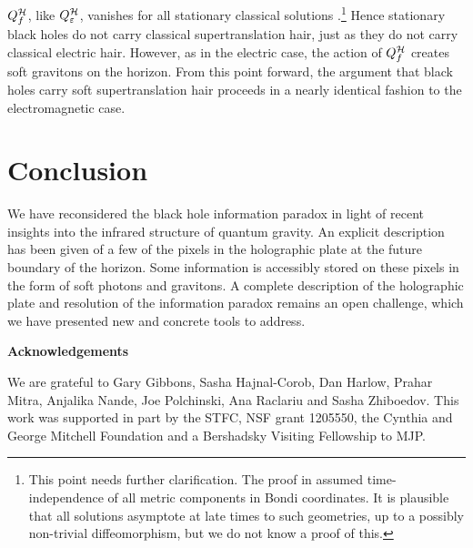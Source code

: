 \documentclass[12pt]{article}
\numberwithin{equation}{section}
\def\e{{\epsilon}}
\def\ch{{\cal H}}
\renewcommand{\epsilon}{\varepsilon}
\begin{document}
$Q^\ch_f$, like $Q^\ch_\e$,  vanishes for all stationary classical solutions \cite{Flanagan:2015pxa}.\footnote{This point needs further clarification. The proof in \cite{Flanagan:2015pxa} assumed time-independence of all metric components in Bondi coordinates. It is plausible that all solutions asymptote at late times to such geometries, up to a possibly non-trivial diffeomorphism, but we do not know a proof of this.} Hence stationary  black holes do not carry classical supertranslation hair, just as they do not carry classical electric hair. However, as in the electric case, the action of $Q^\ch_f$ 
creates soft gravitons on the horizon.  From this point forward, the argument that black holes carry soft supertranslation hair proceeds in a nearly identical fashion to the electromagnetic case.  




\section{Conclusion}

We have reconsidered the  black hole information paradox in light of recent insights into the infrared structure of quantum gravity. An explicit description has been given of a few of the pixels in the holographic plate at the future boundary of the horizon.  Some information is accessibly stored on these pixels in the form of soft photons and gravitons. A complete description of the holographic plate and resolution of the information paradox remains an open challenge, which we have presented new and concrete tools to address.

  
\bigskip

\centerline{\bf Acknowledgements}
We are grateful to Gary Gibbons, Sasha Hajnal-Corob, Dan Harlow, Prahar Mitra, Anjalika Nande, Joe Polchinski, Ana Raclariu and Sasha Zhiboedov.
This work was supported in part by the STFC, NSF grant 1205550, the Cynthia and George Mitchell Foundation and a Bershadsky Visiting Fellowship to MJP. 
\end{document}

